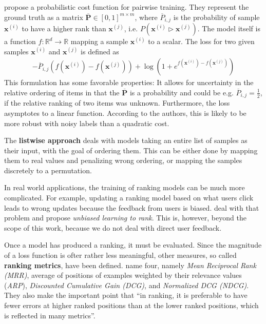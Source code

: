 \cite{Burges:learningtorankwithsgd} propose a probabilistic cost function for pairwise training. 
They represent the ground truth as a matrix $\bm{\overline{P}}\in[0,1]^{m\times m}$, where $\overline{P}_{i,j}$ is the probability of sample $\bm{x}^{(i)}$ to have a higher rank than $\bm{x}^{(j)}$, i.e. $P(\bm{x}^{(i)}\triangleright \bm{x}^{(j)})$. 
The model itself is a function $f:\mathbb{R}^d\rightarrow\mathbb{R}$ mapping a sample $\bm{x}^{(i)}$ to a scalar. The loss for two given samples $\bm{x}^{(i)}$ and $\bm{x}^{(j)}$ is defined as
\begin{align}
-\overline{P}_{i,j}\left(f\left(\bm{x}^{(i)}\right)-f\left(\bm{x}^{(j)}\right)\right)+\log\left(1+e^{f\left(\bm{x}^{(i)}\right)-f\left(\bm{x}^{(j)}\right)}\right)
\end{align}
This formulation has some favorable properties: It allows for uncertainty in the relative ordering of items in that the $\bm{\overline{P}}$ is a probability and could be e.g. $\overline{P}_{i,j}=\frac{1}{2}$, if the relative ranking of two items was unknown. Furthermore, the loss asymptotes to a linear function. According to the authors, this is likely to be more robust with noisy labels than a quadratic cost.

The \textbf{listwise approach} deals with models taking an entire list of samples as their input, with the goal of ordering them. This can be either done by mapping them to real values and penalizing wrong ordering, or mapping the samples discretely to a permutation.

In real world applications, the training of ranking models can be much more complicated. For example, updating a ranking model based on what users click leads to wrong updates because the feedback from users is biased. \cite{unbiasedlearningtorank} deal with that problem and propose \textit{unbiased learning to rank}. This is, however, beyond the scope of this work, because we do not deal with direct user feedback.

Once a model has produced a ranking, it must be evaluated. Since the magnitude of a loss function is ofter rather less meaningful, other measures, so called \textbf{ranking metrics}, have been defined. \cite{tfranking} name four, namely \textit{Mean Reciprocal Rank (MRR)}, average of positions of examples weighted by their relevance values (\textit{ARP}), \textit{Discounted Cumulative Gain (DCG)}, and \textit{Normalized DCG (NDCG)}. They also make the important point that ``in ranking, it is preferable to have fewer errors at higher ranked positions than at the lower ranked positions, which is reflected in many metrics''.

